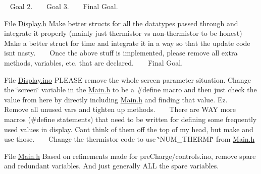 \begin{DoxyRefList}
 ~\newline
 Goal 2. ~\newline
 ~\newline
 Goal 3. ~\newline
 ~\newline
 Final Goal.  
\item[File \mbox{\hyperlink{_display_8h}{Display.h}} ]\label{todo__todo000005}%
%
 Make better structs for all the datatypes passed through and integrate it properly (mainly just thermistor vs non-\/thermistor to be honest) ~\newline
 ~\newline
 Make a better struct for time and integrate it in a way so that the update code isn\textquotesingle{}t nasty. ~\newline
 ~\newline
 Once the above stuff is implemented, please remove all extra methods, variables, etc. that are declared. ~\newline
 ~\newline
 Final Goal.  
\item[File \mbox{\hyperlink{_display_8ino}{Display.ino}} ]\label{todo__todo000006}%
%
 PLEASE remove the whole screen parameter situation. Change the \char`\"{}screen\char`\"{} variable in the \mbox{\hyperlink{_main_8h}{Main.\+h}} to be a \#define macro and then just check the value from here by directly including \mbox{\hyperlink{_main_8h}{Main.\+h}} and finding that value. Ez. ~\newline
 ~\newline
 Remove all unused vars and tighten up methods. ~\newline
 ~\newline
 There are WAY more macros (\#define statements) that need to be written for defining some frequently used values in display. Can\textquotesingle{}t think of them off the top of my head, but make and use those. ~\newline
 ~\newline
 Change the thermistor code to use \char`\"{}\+NUM\+\_\+\+THERMI\char`\"{} from \mbox{\hyperlink{_main_8h}{Main.\+h}}  
\item[File \mbox{\hyperlink{_main_8h}{Main.h}} ]\label{todo__todo000007}%
%
 Based on refinements made for pre\+Charge/controls.\+ino, remove spare and redundant variables. And just generally ALL the spare variables. ~\newline
 ~\newline

\end{DoxyRefList}
